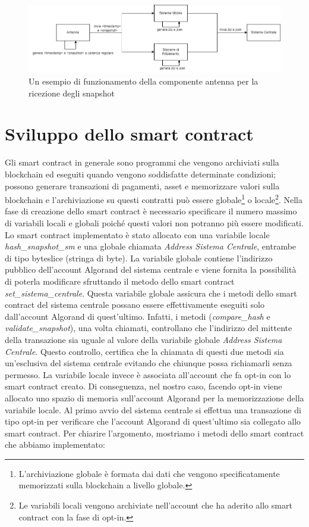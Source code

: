 \begin{figure}[h]
\centering
\includegraphics[scale=0.5]{images/ricezione_snapshot.png}
\caption{Un esempio di funzionamento della componente antenna per la ricezione degli snapshot}
\label{fig: ricevi_snapshot }
\end{figure}

\section{Sviluppo dello smart contract}
Gli smart contract in generale sono programmi che vengono archiviati sulla blockchain ed eseguiti quando vengono soddisfatte determinate condizioni; possono generare transazioni di pagamenti, asset e memorizzare valori sulla blockchain e l’archiviazione su questi contratti può essere globale\footnote{L’archiviazione globale è formata dai dati che vengono specificatamente memorizzati sulla blockchain a livello globale.} o locale\footnote{Le variabili locali vengono archiviate nell'account che ha aderito allo smart contract con la fase di opt-in.}. Nella fase di creazione dello smart contract è necessario specificare il numero massimo di variabili locali e globali poiché questi valori non potranno più essere modificati. Lo smart contract implementato è stato allocato con una variabile locale \textit{hash\_snapshot\_sm} e una globale chiamata \textit{Address Sistema Centrale}, entrambe di tipo byteslice (stringa di byte). La variabile globale contiene l'indirizzo pubblico dell'account Algorand del sistema centrale e viene fornita la possibilità di poterla modificare sfruttando il metodo dello smart contract \textit{set\_sistema\_centrale}. Questa variabile globale assicura che i metodi dello smart contract del sistema centrale possano essere effettivamente eseguiti solo dall'account Algorand di quest'ultimo. Infatti, i metodi (\textit{compare\_hash} e \textit{validate\_snapshot}), una volta chiamati, controllano che l'indirizzo del mittente della transazione sia uguale al valore della variabile globale \textit{Address Sistema Centrale}. Questo controllo, certifica che la chiamata di questi due metodi sia un'esclusiva del sistema centrale evitando che chiunque possa richiamarli senza permesso. La variabile locale invece è associata all'account che fa opt-in con lo smart contract creato. Di conseguenza, nel nostro caso, facendo opt-in viene allocato uno spazio di memoria sull'account Algorand per la memorizzazione della variabile locale. Al primo avvio del sistema centrale si effettua una transazione di tipo opt-in per verificare che l'account Algorand di quest'ultimo sia collegato allo smart contract. Per chiarire l'argomento, mostriamo i metodi dello smart contract che abbiamo implementato:
